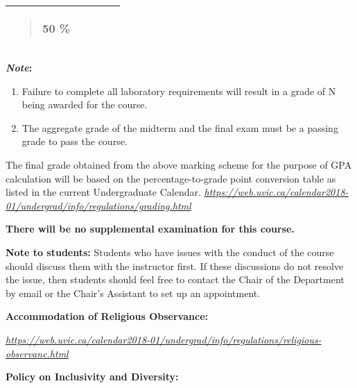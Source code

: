 \begin{longtable}[]{@{}lllll@{}}
\begin{minipage}[t]{0.19\columnwidth}
\begin{quote}
50 \%
\end{quote}\strut
\end{minipage} & \begin{minipage}[t]{0.19\columnwidth}\raggedright\strut
\strut
\end{minipage} & \begin{minipage}[t]{0.19\columnwidth}\raggedright\strut
\strut
\end{minipage} & \begin{minipage}[t]{0.19\columnwidth}\raggedright\strut
\strut
\end{minipage}\tabularnewline
\bottomrule
\end{longtable}

\textbf{\emph{Note}:}

\begin{enumerate}
\def\labelenumi{\arabic{enumi}.}
\item
  Failure to complete all laboratory requirements will result in a grade
  of N being awarded for the course.
\item
  The aggregate grade of the midterm and the final exam must be a
  passing grade to pass the course.
\end{enumerate}

The final grade obtained from the above marking scheme for the purpose
of GPA calculation will be based on the percentage-to-grade point
conversion table as listed in the current Undergraduate Calendar.
\href{https://web.uvic.ca/calendar2018-01/undergrad/info/regulations/grading.html}{\emph{https://web.uvic.ca/calendar2018-01/undergrad/info/regulations/grading.html}}

\textbf{There will be no supplemental examination for this course.}

\textbf{Note to students:} Students who have issues with the conduct of
the course should discuss them with the instructor first. If these
discussions do not resolve the issue, then students should feel free to
contact the Chair of the Department by email or the Chair's Assistant to
set up an appointment.

\textbf{Accommodation of Religious Observance:}

\href{https://web.uvic.ca/calendar2018-01/undergrad/info/regulations/religious-observanc.html}{\emph{https://web.uvic.ca/calendar2018-01/undergrad/info/regulations/religious-observanc.html}}

\textbf{Policy on Inclusivity and Diversity:}

